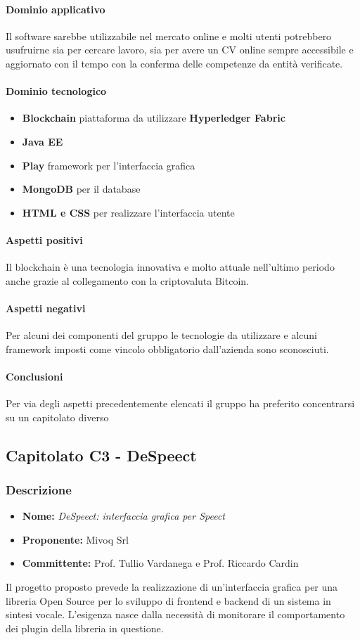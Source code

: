 	\paragraph{Dominio applicativo} \Spazio
	Il software sarebbe utilizzabile nel mercato online e molti utenti potrebbero usufruirne sia per cercare lavoro, sia per avere un CV online sempre accessibile e aggiornato con il tempo con la conferma delle competenze da entità verificate.
	\paragraph{Dominio tecnologico} \Spazio
	\begin{itemize}
		\item \textbf{Blockchain} piattaforma da utilizzare \textbf{Hyperledger Fabric}
		\item  \textbf{Java EE}
		\item  \textbf{Play} framework per l'interfaccia grafica
		\item  \textbf{MongoDB} per il database
		\item  \textbf{HTML e CSS} per realizzare l'interfaccia utente	
	\end{itemize}
	
	\paragraph{Aspetti positivi} \Spazio
	Il blockchain è una tecnologia innovativa e molto attuale nell'ultimo periodo anche grazie al collegamento con la criptovaluta Bitcoin. 
	\paragraph{Aspetti negativi} \Spazio
	Per alcuni dei componenti del gruppo le tecnologie da utilizzare e alcuni framework imposti come vincolo obbligatorio dall'azienda sono sconosciuti.
	\paragraph{Conclusioni} \Spazio
	Per via degli aspetti precedentemente elencati il gruppo ha preferito concentrarsi su un capitolato diverso
	
	
	\subsection{Capitolato C3 - DeSpeect}
	\subsubsection{Descrizione}
	\begin{itemize}
		\item \textbf{Nome:} \emph{DeSpeect: interfaccia grafica per Speect}
		\item \textbf{Proponente:} Mivoq Srl
		\item \textbf{Committente:} Prof. Tullio Vardanega e Prof. Riccardo Cardin
     \end{itemize}	
		Il progetto proposto prevede la realizzazione di un'interfaccia grafica per una libreria Open Source per lo sviluppo di frontend e backend di un sistema in sintesi vocale.
		L'esigenza nasce dalla necessità di monitorare il comportamento dei plugin della libreria in questione.
